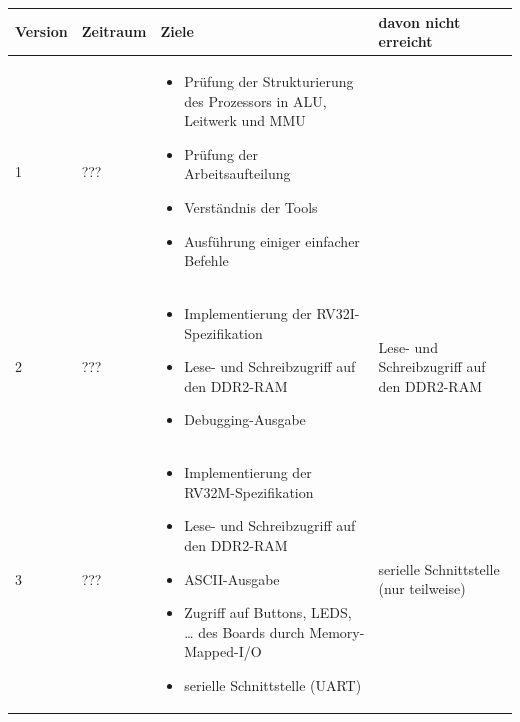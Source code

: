 \begin{tabular}{|l|l|p{180pt}|l|}
\hline                                                                                                                                               
Version & Zeitraum & Ziele                                                                            & davon nicht erreicht                          \\
\hline                                                                                                                                               
1       & ???      & \begin{itemize}[noitemsep,topsep=0pt]
                     \item Pr\"ufung der Strukturierung des Prozessors in ALU, Leitwerk und MMU
                     \item Pr\"ufung der Arbeitsaufteilung
                     \item Verst\"andnis der Tools
                     \item Ausf\"uhrung einiger einfacher Befehle
                     \end{itemize}                                                                    &                                               \\
\hline
2       & ???      & \begin{itemize}[noitemsep,topsep=0pt]
                     \item Implementierung der RV32I-Spezifikation
                     \item Lese- und Schreibzugriff auf den DDR2-RAM
                     \item Debugging-Ausgabe
                     \end{itemize}                                                                    & Lese- und Schreibzugriff auf den DDR2-RAM     \\
\hline
3       & ???      & \begin{itemize}[noitemsep,topsep=0pt]
                     \item Implementierung der RV32M-Spezifikation
                     \item Lese- und Schreibzugriff auf den DDR2-RAM
                     \item ASCII-Ausgabe
                     \item Zugriff auf Buttons, LEDS, \dots{} des Boards durch Memory-Mapped-I/O
                     \item serielle Schnittstelle (UART)
                     \end{itemize}                                                                    & serielle Schnittstelle (nur teilweise)        \\
\end{tabular}

